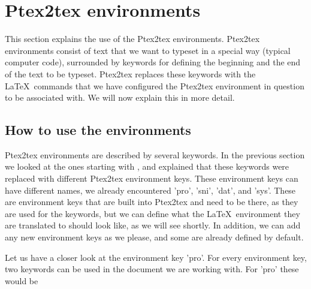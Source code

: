 \documentclass[a4paper,11pt]{article}
\begin{document}
{\section{Ptex2tex environments}\label{sec:config}
This section explains the use of the Ptex2tex
environments. Ptex2tex environments consist of text that we want to
typeset in a special way (typical computer code), surrounded by keywords for
defining the beginning and the end of the text to be
typeset. Ptex2tex replaces these keywords with the \LaTeX~commands
that we have configured the Ptex2tex environment in question to be
associated with. We will now explain this in more detail.

\subsection{How to use the environments}
Ptex2tex environments are described by several keywords. In the
previous section we looked at the ones starting with , and
explained that these keywords were replaced with different Ptex2tex
environment keys. These environment keys can have different names, we already
encountered 'pro', 'sni', 'dat', and 'sys'. These are environment keys that are
built into Ptex2tex and need to be there, as they are used for the
 keywords, but we can define what the \LaTeX~environment they are
translated to should look like, as we
will see shortly. In addition, we can add any new environment keys as we
please, and some are already defined by default.

Let us have a closer look at the environment key 'pro'. For every environment
key, two keywords can be used in the document we are working with. For 'pro'
these would be }
\end{document}
